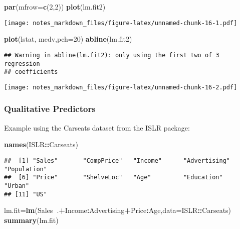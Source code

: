 \documentclass[]{article}
\newenvironment{Shaded}{\begin{snugshade}}{\end{snugshade}}
\newcommand{\KeywordTok}[1]{\textcolor[rgb]{0.13,0.29,0.53}{\textbf{#1}}}
\newcommand{\DataTypeTok}[1]{\textcolor[rgb]{0.13,0.29,0.53}{#1}}
\newcommand{\DecValTok}[1]{\textcolor[rgb]{0.00,0.00,0.81}{#1}}
\newcommand{\OperatorTok}[1]{\textcolor[rgb]{0.81,0.36,0.00}{\textbf{#1}}}
\newcommand{\NormalTok}[1]{#1}
\begin{document}
\begin{Shaded}
\begin{Highlighting}[]
\KeywordTok{par}\NormalTok{(}\DataTypeTok{mfrow=}\KeywordTok{c}\NormalTok{(}\DecValTok{2}\NormalTok{,}\DecValTok{2}\NormalTok{))}
\KeywordTok{plot}\NormalTok{(lm.fit2)}
\end{Highlighting}
\end{Shaded}

\texttt{[image: notes\_markdown\_files/figure-latex/unnamed-chunk-16-1.pdf]}

\begin{Shaded}
\begin{Highlighting}[]
\KeywordTok{plot}\NormalTok{(lstat, medv,}\DataTypeTok{pch=}\DecValTok{20}\NormalTok{)}
\KeywordTok{abline}\NormalTok{(lm.fit2)}
\end{Highlighting}
\end{Shaded}

\begin{verbatim}
## Warning in abline(lm.fit2): only using the first two of 3 regression
## coefficients
\end{verbatim}

\texttt{[image: notes\_markdown\_files/figure-latex/unnamed-chunk-16-2.pdf]}

\subsubsection{Qualitative Predictors}\label{qualitative-predictors}

Example using the Carseats dataset from the ISLR package:

\begin{Shaded}
\begin{Highlighting}[]
\KeywordTok{names}\NormalTok{(ISLR}\OperatorTok{::}\NormalTok{Carseats)}
\end{Highlighting}
\end{Shaded}

\begin{verbatim}
##  [1] "Sales"       "CompPrice"   "Income"      "Advertising" "Population" 
##  [6] "Price"       "ShelveLoc"   "Age"         "Education"   "Urban"      
## [11] "US"
\end{verbatim}

\begin{Shaded}
\begin{Highlighting}[]
\NormalTok{lm.fit=}\KeywordTok{lm}\NormalTok{(Sales}\OperatorTok{~}\NormalTok{.}\OperatorTok{+}\NormalTok{Income}\OperatorTok{:}\NormalTok{Advertising}\OperatorTok{+}\NormalTok{Price}\OperatorTok{:}\NormalTok{Age,}\DataTypeTok{data=}\NormalTok{ISLR}\OperatorTok{::}\NormalTok{Carseats)}
\KeywordTok{summary}\NormalTok{(lm.fit)}
\end{Highlighting}
\end{Shaded}
\end{document}
